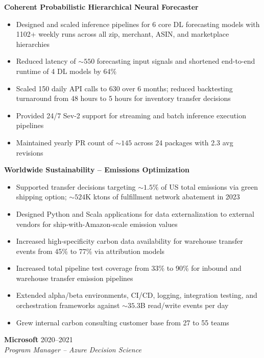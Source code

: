 \documentclass[10pt,letterpaper]{article}
\begin{document}
\vspace{4pt}
\textbf{Coherent Probabilistic Hierarchical Neural Forecaster}
\begin{itemize}
  \item Designed and scaled inference pipelines for 6 core DL forecasting models with 1102+ weekly runs across all zip, merchant, ASIN, and marketplace hierarchies
  \item Reduced latency of ${\sim}550$ forecasting input signals and shortened end-to-end runtime of 4 DL models by 64\%
  \item Scaled 150 daily API calls to 630 over 6 months; reduced backtesting turnaround from 48 hours to 5 hours for inventory transfer decisions
  \item Provided 24/7 Sev-2 support for streaming and batch inference execution pipelines
  \item Maintained yearly PR count of ${\sim}145$ across 24 packages with 2.3 avg revisions
\end{itemize}

\vspace{4pt}
\textbf{Worldwide Sustainability -- Emissions Optimization}
\begin{itemize}
  \item Supported transfer decisions targeting ${\sim}1.5\%$ of US total emissions via green shipping option; ${\sim}524$K ktons of fulfillment network abatement in 2023
  \item Designed Python and Scala applications for data externalization to external vendors for ship-with-Amazon-scale emission values
  \item Increased high-specificity carbon data availability for warehouse transfer events from 45\% to 77\% via attribution models
  \item Increased total pipeline test coverage from 33\% to 90\% for inbound and warehouse transfer emission pipelines
  \item Extended alpha/beta environments, CI/CD, logging, integration testing, and orchestration frameworks against ${\sim}35.3$B read/write events per day
  \item Grew internal carbon consulting customer base from 27 to 55 teams
\end{itemize}

\vspace{6pt}
\textbf{Microsoft} \hfill 2020--2021\\
\textit{Program Manager -- Azure Decision Science}
\end{document}

